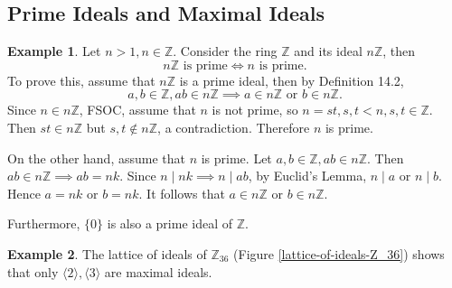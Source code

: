 \documentclass{article}
\theoremstyle{definition}
\newtheorem{definition}{Definition}[section]
\newtheorem{example}{Example}[section]
\begin{document}
\subsection{Prime Ideals and Maximal Ideals}

\begin{example}
    Let $n>1,n\in\mathbb{Z}$. Consider the ring $\mathbb{Z}$ and its ideal $n\mathbb{Z}$, then
    \begin{equation*}
        \text{$n\mathbb{Z}$ is prime} \iff \text{$n$ is prime}.
    \end{equation*}
    To prove this, assume that $n\mathbb{Z}$ is a prime ideal, then by Definition 14.2,
    \begin{equation*}
        a,b\in \mathbb{Z}, ab\in n\mathbb{Z} \implies a\in n\mathbb{Z} \text{ or } b\in n\mathbb{Z}.
    \end{equation*}
    Since $n \in n\mathbb{Z}$, FSOC, assume that $n$ is not prime, so $n=st, s,t<n, s,t\in \mathbb{Z}$. Then $st \in n\mathbb{Z}$ but $s,t\notin n\mathbb{Z}$, a contradiction. Therefore $n$ is prime.
    
    On the other hand, assume that $n$ is prime. Let $a,b \in\mathbb{Z}, ab\in n\mathbb{Z}$. Then $ab\in n\mathbb{Z}\implies ab=nk$. Since $n\mid nk \implies n\mid ab$, by Euclid's Lemma, $n\mid a$ or $n\mid b$. Hence $a=nk$ or $b=nk$. It follows that $a\in n\mathbb{Z}$ or $b\in n\mathbb{Z}$.
    
    Furthermore, $\{0\}$ is also a prime ideal of $\mathbb{Z}$.
\end{example}

\begin{example}
    The lattice of ideals of $\mathbb{Z}_{36}$ (Figure \ref{lattice-of-ideals-Z_36}) shows that only $\langle 2 \rangle,\langle 3 \rangle$ are maximal ideals. 
\end{example}
\end{document}
